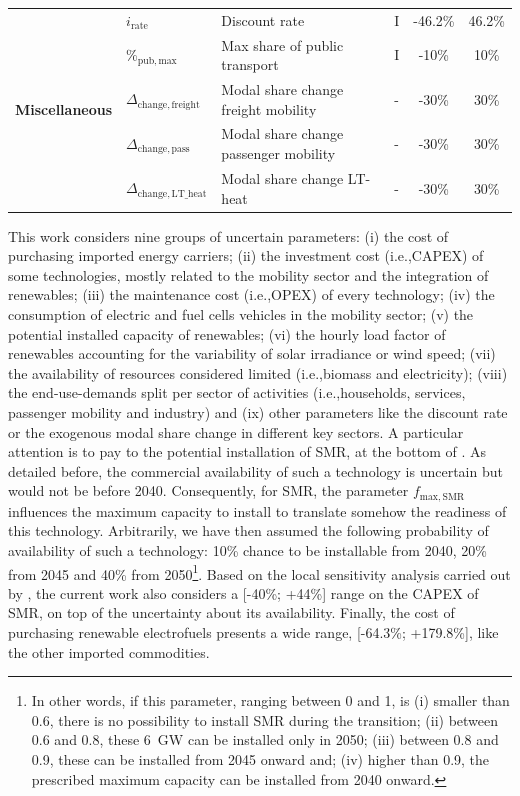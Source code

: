 \documentclass[11pt,twoside,a4paper,english]{article}
\def\ie{i.e.,}
\begin{document}
\begin{appendices}
\begin{table}[htbp!]
\begin{minipage}{\linewidth}
{\begin{tabular}{l l l c c c}
\multirow{5}{*}{\textbf{Miscellaneous}} &$i_{\mathrm{rate}}$  & Discount rate & I & -46.2\% & 46.2\% \\
& $\%_{\mathrm{pub,max}}$ & Max share of public transport & I & -10\% & 10\% \\
& $\Delta_{\mathrm{change,freight}}$ & Modal share change freight mobility & - & -30\% & 30\% \\
& $\Delta_{\mathrm{change,pass}}$ & Modal share change passenger mobility & - & -30\% & 30\% \\
& $\Delta_{\mathrm{change,LT\_heat}}$ & Modal share change LT-heat & - & -30\% & 30\% \\
\bottomrule							

\end{tabular}}
\end{minipage}
\end{table}

This work considers nine groups of uncertain parameters: (i) the cost of purchasing imported energy carriers; (ii) the investment cost (\ie CAPEX) of some technologies, mostly related to the mobility sector and the integration of renewables; (iii) the maintenance cost (\ie OPEX) of every technology; (iv) the consumption of electric and fuel cells vehicles in the mobility sector; (v) the potential installed capacity of renewables; (vi) the hourly load factor of renewables accounting for the variability of solar irradiance or wind speed; (vii) the availability of resources considered limited (\ie biomass and electricity); (viii) the end-use-demands split per sector of activities (\ie households, services, passenger mobility and industry) and (ix) other parameters like the discount rate or the exogenous modal share change in different key sectors. A particular attention is to pay to the potential installation of \gls{SMR}, at the bottom of . As detailed before, the commercial availability of such a technology is uncertain but would not be before 2040. Consequently, for \gls{SMR}, the parameter $f_{\mathrm{max,SMR}}$ influences the maximum capacity to install to translate somehow the readiness of this technology. Arbitrarily, we have then assumed the following probability of availability of such a technology: 10\% chance to be installable from 2040, 20\% from 2045 and 40\% from 2050\footnote{In other words, if this parameter, ranging between 0 and 1, is (i) smaller than 0.6, there is no possibility to install \gls{SMR} during the transition; (ii) between 0.6 and 0.8, these 6~GW can be installed only in 2050; (iii) between 0.8 and 0.9, these can be installed from 2045 onward and; (iv) higher than 0.9, the prescribed maximum capacity can be installed from 2040 onward. }. Based on the local sensitivity analysis carried out by \citet{PATHS2050}, the current work also considers a [-40\%; +44\%] range on the CAPEX of SMR, on top of the uncertainty about its availability. Finally, the cost of purchasing renewable electrofuels presents a wide range, [-64.3\%; +179.8\%], like the other imported commodities.


\end{appendices}
\end{document}
